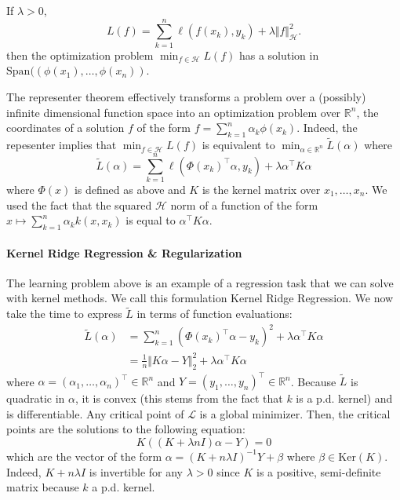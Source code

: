 \begin{mdframed}
\begin{theorem}If $\lambda > 0$,
\begin{equation}
    L(f) = \sum_{k=1}^n \ell(f(x_k), y_k) + \lambda \Vert f \Vert_\mathcal H^2.
\end{equation}
then the optimization problem $\min_{f\in\mathcal H}L(f)$ has a solution in $\mathrm{Span}((\phi(x_1), \ldots, \phi(x_n))$.
\end{theorem}
\end{mdframed}

The representer theorem effectively transforms a problem over a (possibly) infinite dimensional function space into an optimization problem over $\mathbb R^n$, the coordinates of a solution $f$ of the form $f= \sum_{k=1}^n \alpha_k \phi(x_k)$. Indeed, the repesenter implies that $\min_{f\in\mathcal H}L(f)$ is equivalent to $\min_{\alpha\in\mathbb R^n}\tilde L(\alpha)$ where
\begin{equation}
\tilde L(\alpha) = \sum_{k=1}^n \ell(\Phi(x_k)^\top\alpha, y_k) + \lambda \alpha^\top K \alpha
\end{equation} where $\Phi(x)$ is defined as above and $K$ is the kernel matrix over $x_1, \ldots, x_n$. We used the fact that the squared $\mathcal H$ norm of a function of the form $x \mapsto \sum_{k=1}^n \alpha_k k(x, x_k)$ is equal to $\alpha^\top K \alpha$.

\paragraph{Kernel Ridge Regression \& Regularization} The learning problem above is an example of a regression task that we can solve with kernel methods. We call this formulation Kernel Ridge Regression. We now take the time to express $\tilde L$ in terms of function evaluations:
\begin{align}
\tilde L(\alpha) &= \sum_{k=1}^n (\Phi(x_k)^\top \alpha - y_k)^2 + \lambda \alpha^\top K\alpha\\
               & = \frac{1}{n}\Vert K\alpha - Y \Vert_2^2 + \lambda \alpha^\top K\alpha
\end{align}
where $\alpha = (\alpha_1, \ldots, \alpha_n)^\top \in\mathbb R^n$ and $Y = (y_1, \ldots, y_n)^\top\in\mathbb R^n$. Because $\tilde L$ is quadratic in $\alpha$, it is convex (this stems from the fact that $k$ is a p.d. kernel) and is differentiable. Any critical point of $\mathcal L$ is a global minimizer. Then, the critical points are the solutions to the following equation:
\begin{equation}
K\left((K + \lambda n I)\alpha - Y\right) = 0
\end{equation}
which are the vector of the form $\alpha = (K + n\lambda I)^{-1}Y + \beta$ where $\beta \in \mathrm{Ker}(K)$. Indeed, $K + n\lambda I$ is invertible for any $\lambda > 0$ since $K$ is a positive, semi-definite matrix because $k$ a p.d. kernel.

